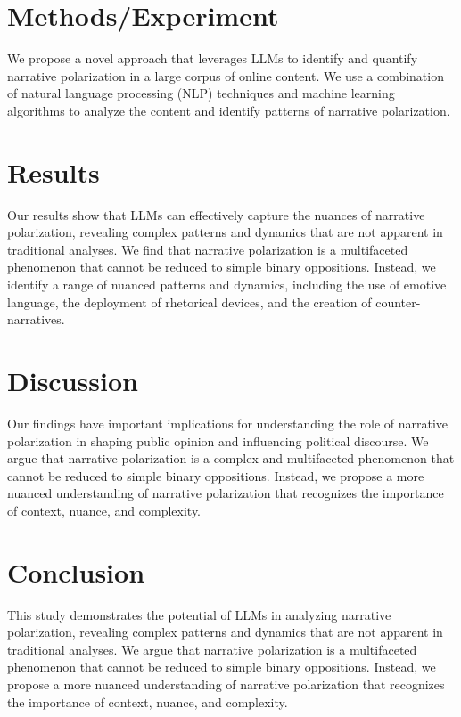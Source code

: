 \documentclass{article}
\begin{document}
\section{Methods/Experiment}

We propose a novel approach that leverages LLMs to identify and quantify narrative polarization in a large corpus of online content. We use a combination of natural language processing (NLP) techniques and machine learning algorithms to analyze the content and identify patterns of narrative polarization.

\section{Results}

Our results show that LLMs can effectively capture the nuances of narrative polarization, revealing complex patterns and dynamics that are not apparent in traditional analyses. We find that narrative polarization is a multifaceted phenomenon that cannot be reduced to simple binary oppositions. Instead, we identify a range of nuanced patterns and dynamics, including the use of emotive language, the deployment of rhetorical devices, and the creation of counter-narratives.

\section{Discussion}

Our findings have important implications for understanding the role of narrative polarization in shaping public opinion and influencing political discourse. We argue that narrative polarization is a complex and multifaceted phenomenon that cannot be reduced to simple binary oppositions. Instead, we propose a more nuanced understanding of narrative polarization that recognizes the importance of context, nuance, and complexity.

\section{Conclusion}

This study demonstrates the potential of LLMs in analyzing narrative polarization, revealing complex patterns and dynamics that are not apparent in traditional analyses. We argue that narrative polarization is a multifaceted phenomenon that cannot be reduced to simple binary oppositions. Instead, we propose a more nuanced understanding of narrative polarization that recognizes the importance of context, nuance, and complexity.
\end{document}

